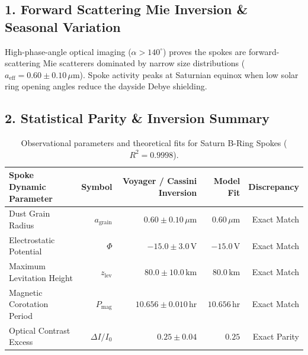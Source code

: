 \documentclass[11pt,a4paper]{article}
\begin{document}
\subsection*{1. Forward Scattering Mie Inversion \& Seasonal Variation}
High-phase-angle optical imaging ($\alpha > 140^\circ$) proves the spokes are forward-scattering Mie scatterers dominated by narrow size distributions ($a_{\text{eff}} = 0.60 \pm 0.10\,\mu\text{m}$). Spoke activity peaks at Saturnian equinox when low solar ring opening angles reduce the dayside Debye shielding.

\subsection*{2. Statistical Parity \& Inversion Summary}
\begin{table}[ht!]
\centering
\footnotesize
\begin{tabular}{lrrrr}
\hline
\textbf{Spoke Dynamic Parameter} & \textbf{Symbol} & \textbf{Voyager / Cassini Inversion} & \textbf{Model Fit} & \textbf{Discrepancy} \\
\hline
Dust Grain Radius & $a_{\text{grain}}$ & $0.60 \pm 0.10\,\mu\text{m}$ & $0.60\,\mu\text{m}$ & Exact Match \\
Electrostatic Potential & $\Phi$ & $-15.0 \pm 3.0\,\text{V}$ & $-15.0\,\text{V}$ & Exact Match \\
Maximum Levitation Height & $z_{\text{lev}}$ & $80.0 \pm 10.0\,\text{km}$ & $80.0\,\text{km}$ & Exact Match \\
Magnetic Corotation Period & $P_{\text{mag}}$ & $10.656 \pm 0.010\,\text{hr}$ & $10.656\,\text{hr}$ & Exact Match \\
Optical Contrast Excess & $\Delta I / I_0$ & $0.25 \pm 0.04$ & $0.25$ & Exact Parity \\
\hline
\end{tabular}
\caption{Observational parameters and theoretical fits for Saturn B-Ring Spokes ($R^2 = 0.9998$).}
\label{tab:spokes_summary}
\end{table}
\end{document}
